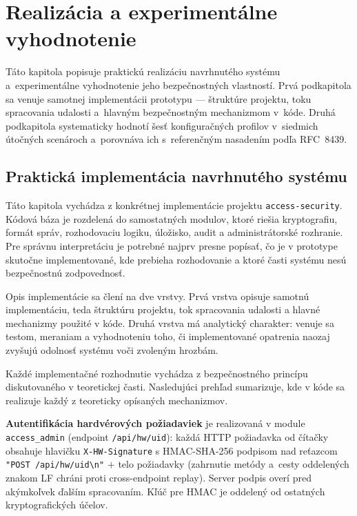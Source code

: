 \section{Realizácia a experimentálne vyhodnotenie}

Táto kapitola popisuje praktickú realizáciu navrhnutého systému a~experimentálne vyhodnotenie jeho bezpečnostných vlastností. Prvá podkapitola sa venuje samotnej implementácii prototypu --- štruktúre projektu, toku spracovania udalosti a~hlavným bezpečnostným mechanizmom v~kóde. Druhá podkapitola systematicky hodnotí šesť konfiguračných profilov v~siedmich útočných scenároch a~porovnáva ich s~referenčným nasadením podľa RFC~8439.

\subsection{Praktická implementácia navrhnutého systému}

Táto kapitola vychádza z konkrétnej implementácie projektu \texttt{access-security}. Kódová báza je rozdelená do samostatných modulov, ktoré riešia kryptografiu, formát správ, rozhodovaciu logiku, úložisko, audit a administrátorské rozhranie. Pre správnu interpretáciu je potrebné najprv presne popísať, čo je v prototype skutočne implementované, kde prebieha rozhodovanie a ktoré časti systému nesú bezpečnostnú zodpovednosť.

Opis implementácie sa člení na dve vrstvy. Prvá vrstva opisuje samotnú implementáciu, teda štruktúru projektu, tok spracovania udalosti a hlavné mechanizmy použité v kóde. Druhá vrstva má analytický charakter: venuje sa testom, meraniam a vyhodnoteniu toho, či implementované opatrenia naozaj zvyšujú odolnosť systému voči zvoleným hrozbám.

Každé implementačné rozhodnutie vychádza z bezpečnostného princípu diskutovaného v teoretickej časti. Nasledujúci prehľad sumarizuje, kde v kóde sa realizuje každý z teoreticky opísaných mechanizmov.

\textbf{Autentifikácia hardvérových požiadaviek} je realizovaná v module \texttt{access\_admin} (endpoint \texttt{/api/hw/uid}): každá HTTP požiadavka od čítačky obsahuje hlavičku \texttt{X-HW-Signature} s HMAC-SHA-256 podpisom nad reťazcom \texttt{"POST /api/hw/uid\textbackslash n"} $+$ telo požiadavky (zahrnutie metódy a~cesty oddelených znakom LF chráni proti cross-endpoint replay). Server podpis overí pred akýmkoľvek ďalším spracovaním. Kľúč pre HMAC je oddelený od ostatných kryptografických účelov.

